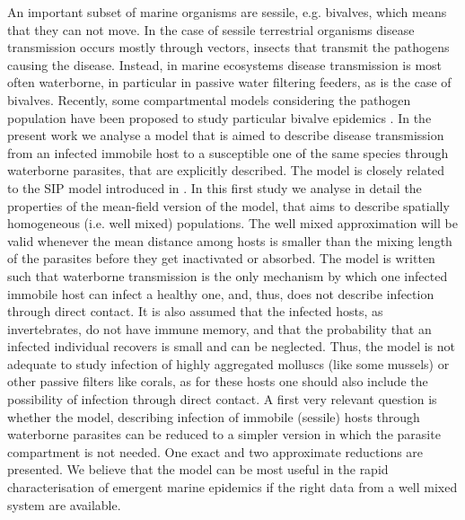 An important subset of marine organisms are sessile, e.g. bivalves, which
means that they can not move.
In the case of sessile terrestrial organisms disease transmission occurs
mostly through vectors, insects that transmit the pathogens causing the
disease. Instead, in marine ecosystems disease transmission is most often
waterborne, in particular in passive water filtering feeders, as is the case of
bivalves. Recently, some compartmental models considering the pathogen
population have been proposed to study particular bivalve epidemics
\cite{BIDEGAIN_2016_2, article_SIP, BIDEGAIN_perkinsus}. In the present work
we analyse a model that is aimed to describe disease transmission from an
infected immobile host to a susceptible one of the same species through
waterborne parasites, that are explicitly described. The model is closely
related to the SIP model introduced in \cite{article_SIP}. In this first study
we analyse in detail the properties of the mean-field version of the model,
that aims to describe spatially homogeneous (i.e. well mixed) populations. The
well mixed approximation will be valid whenever the mean distance among hosts
is smaller than the mixing length of the parasites before they get inactivated
or absorbed.
The model is written such that waterborne transmission is the only
mechanism by which one infected immobile host can infect a healthy one, and,
thus, does not describe infection through direct contact.
It is also assumed that the infected hosts, as invertebrates, do not have
immune memory, and that the probability that an infected individual recovers is
small and can be neglected.
Thus, the model is not adequate to study infection of highly aggregated
molluscs (like some mussels) or other passive filters like corals, as for these
hosts one should also include the possibility of infection through direct
contact. A first very relevant question is whether the model, describing
infection of immobile (sessile) hosts through waterborne parasites can be
reduced to a simpler version in which the parasite compartment is not needed.
One exact and two approximate reductions are presented. We believe that
the model can be most useful in the rapid characterisation of emergent marine
epidemics if the right data from a well mixed system are available.

